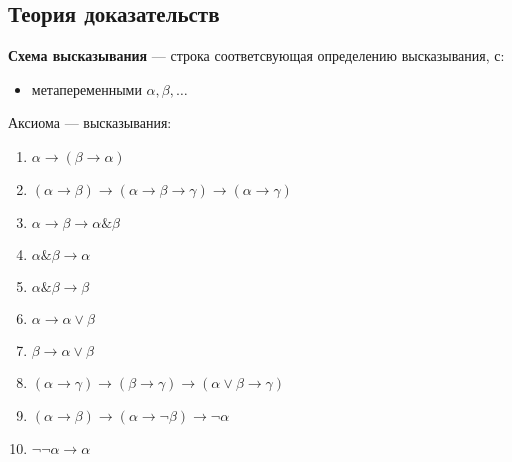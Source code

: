 \documentclass[oneside]{book}
\begin{document}
\subsection{Теория доказательств}
\label{sec:org8b77db9}
\begin{definition}
	\textbf{Схема высказывания} --- строка соответсвующая определению высказывания, с:
	\begin{itemize}
		\item метапеременными \(\alpha, \beta, \dots\)
	\end{itemize}
\end{definition}
\begin{definition}
	Аксиома --- высказывания:
	\begin{enumerate}
		\item \(\alpha \to (\beta \to \alpha)\)
		\item \((\alpha \to \beta) \to (\alpha \to \beta \to \gamma) \to (\alpha \to \gamma)\)
		\item \(\alpha \to \beta \to \alpha \& \beta\)
		\item \(\alpha \& \beta \to \alpha\)
		\item \(\alpha \& \beta \to \beta\)
		\item \(\alpha \to \alpha \vee \beta\)
		\item \(\beta \to \alpha \vee \beta\)
		\item \((\alpha \to \gamma) \to (\beta \to \gamma) \to (\alpha \vee \beta \to \gamma)\)
		\item \((\alpha \to \beta) \to (\alpha \to \neg \beta) \to \neg \alpha\)
		\item \(\neg\neg \alpha \to \alpha\)
	\end{enumerate}
\end{definition}
\end{document}

